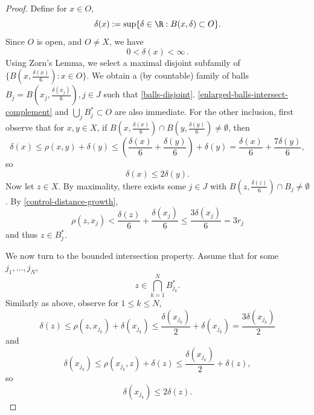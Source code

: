 \begin{proof}
Define for $x\in O$,
\begin{equation}
    \delta(x):= \sup \{\delta\in\R : B(x,\delta)\subset O\}.
\end{equation}
Since $O$ is open, and $O\ne X$, we have
\begin{equation}
    0 < \delta(x) < \infty \,.
\end{equation}
Using Zorn's Lemma, we select a maximal disjoint subfamily of $\{B(x,\frac{\delta(x)}{6}) : x \in O\}$.
We obtain a (by  countable) family of balls $B_j = B(x_j, \frac{\delta(x_j)}{6}), j \in J$ such that \eqref{balls-disjoint}. \eqref{enlarged-balls-intersect-complement} and $\bigcup_j B_j^* \subset O$ are also immediate. For the other inclusion, first observe that for $x,y\in X$,  if $B(x,\frac{\delta(x)}{6}) \cap B(y,\frac{\delta(y)}{6}) \ne \emptyset$, then
\begin{equation*}
    \delta(x) \le \rho(x,y) + \delta(y) \le (\frac{\delta(x)}{6} + \frac{\delta(y)}{6}) + \delta(y) = \frac{\delta(x)}{6} + \frac{7\delta(y)}{6},
\end{equation*}
so
\begin{equation}
    \label{control-distance-growth}
    \delta(x) \le 2 \delta(y).
\end{equation}
Now let $z\in X$. By maximality, there exists some $j\in J$ with $B(z,\frac{\delta(z)}{6}) \cap B_j \ne \emptyset$. By \eqref{control-distance-growth},
\begin{equation*}
    \rho(z,x_j)< \frac{\delta(z)}{6} + \frac{\delta(x_j)}{6} \le \frac{3\delta(x_j)}{6} = 3r_j
\end{equation*}
and thus $z\in B_j^*$.

We now turn to the bounded intersection property. Assume that for some $j_1,\dots,j_N$,
\begin{equation}
    z\in \bigcap_{k=1}^N B_{j_k}^*.
\end{equation}
Similarly as above, observe for $1\le k \le N$,
\begin{equation}
    \label{control-distance-growth-b}
    \delta(z) \le \rho(z,x_{j_k}) + \delta(x_{j_k}) \le \frac{\delta(x_{j_k})}{2} + \delta(x_{j_k}) = \frac{3\delta(x_{j_k})}{2}
\end{equation}
and
\begin{equation*}
    \delta(x_{j_k}) \le \rho(x_{j_k},z) + \delta(z) \le \frac{\delta(x_{j_k})}{2} + \delta(z),
\end{equation*}
so
\begin{equation}
    \label{control-distance-growth-c}
    \delta(x_{j_k}) \le 2 \delta(z).
\end{equation}


\end{proof}
